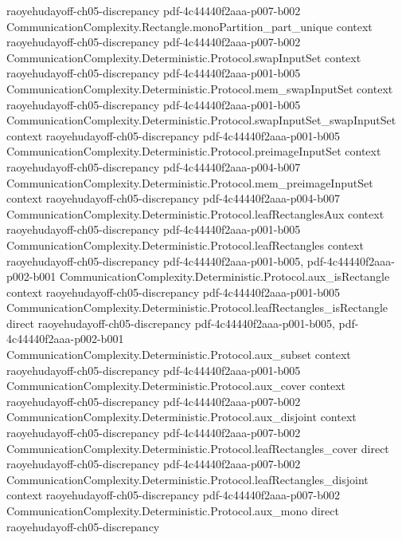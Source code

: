 \begin{lemma}
  {raoyehudayoff-ch05-discrepancy}
  {pdf-4c44440f2aaa-p007-b002}
\proofstep
  {CommunicationComplexity.Rectangle.monoPartition_part_unique}
  {context}
  {raoyehudayoff-ch05-discrepancy}
  {pdf-4c44440f2aaa-p007-b002}
\proofstep
  {CommunicationComplexity.Deterministic.Protocol.swapInputSet}
  {context}
  {raoyehudayoff-ch05-discrepancy}
  {pdf-4c44440f2aaa-p001-b005}
\proofstep
  {CommunicationComplexity.Deterministic.Protocol.mem_swapInputSet}
  {context}
  {raoyehudayoff-ch05-discrepancy}
  {pdf-4c44440f2aaa-p001-b005}
\proofstep
  {CommunicationComplexity.Deterministic.Protocol.swapInputSet_swapInputSet}
  {context}
  {raoyehudayoff-ch05-discrepancy}
  {pdf-4c44440f2aaa-p001-b005}
\proofstep
  {CommunicationComplexity.Deterministic.Protocol.preimageInputSet}
  {context}
  {raoyehudayoff-ch05-discrepancy}
  {pdf-4c44440f2aaa-p004-b007}
\proofstep
  {CommunicationComplexity.Deterministic.Protocol.mem_preimageInputSet}
  {context}
  {raoyehudayoff-ch05-discrepancy}
  {pdf-4c44440f2aaa-p004-b007}
\proofstep
  {CommunicationComplexity.Deterministic.Protocol.leafRectanglesAux}
  {context}
  {raoyehudayoff-ch05-discrepancy}
  {pdf-4c44440f2aaa-p001-b005}
\proofstep
  {CommunicationComplexity.Deterministic.Protocol.leafRectangles}
  {context}
  {raoyehudayoff-ch05-discrepancy}
  {pdf-4c44440f2aaa-p001-b005,
    pdf-4c44440f2aaa-p002-b001}
\proofstep
  {CommunicationComplexity.Deterministic.Protocol.aux_isRectangle}
  {context}
  {raoyehudayoff-ch05-discrepancy}
  {pdf-4c44440f2aaa-p001-b005}
\proofstep
  {CommunicationComplexity.Deterministic.Protocol.leafRectangles_isRectangle}
  {direct}
  {raoyehudayoff-ch05-discrepancy}
  {pdf-4c44440f2aaa-p001-b005,
    pdf-4c44440f2aaa-p002-b001}
\proofstep
  {CommunicationComplexity.Deterministic.Protocol.aux_subset}
  {context}
  {raoyehudayoff-ch05-discrepancy}
  {pdf-4c44440f2aaa-p001-b005}
\proofstep
  {CommunicationComplexity.Deterministic.Protocol.aux_cover}
  {context}
  {raoyehudayoff-ch05-discrepancy}
  {pdf-4c44440f2aaa-p007-b002}
\proofstep
  {CommunicationComplexity.Deterministic.Protocol.aux_disjoint}
  {context}
  {raoyehudayoff-ch05-discrepancy}
  {pdf-4c44440f2aaa-p007-b002}
\proofstep
  {CommunicationComplexity.Deterministic.Protocol.leafRectangles_cover}
  {direct}
  {raoyehudayoff-ch05-discrepancy}
  {pdf-4c44440f2aaa-p007-b002}
\proofstep
  {CommunicationComplexity.Deterministic.Protocol.leafRectangles_disjoint}
  {context}
  {raoyehudayoff-ch05-discrepancy}
  {pdf-4c44440f2aaa-p007-b002}
\proofstep
  {CommunicationComplexity.Deterministic.Protocol.aux_mono}
  {direct}
  {raoyehudayoff-ch05-discrepancy}

\end{lemma}

